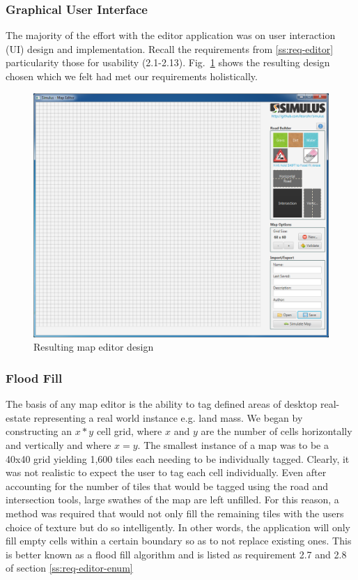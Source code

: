 \subsubsection{Graphical User Interface}
The majority of the effort with the editor application was on user interaction (UI) design and implementation. Recall the requirements from \ref{ss:req-editor} particularity those for usability (2.1-2.13). Fig.~\ref{fig:finalMapEditor} shows the resulting design chosen which we felt had met our requirements holistically.


\begin{figure}[h]
	\begin{center}
			\includegraphics[scale=0.45]{img/mapEditorFinal.png}
		\caption{Resulting map editor design}
		\label{fig:finalMapEditor}
	\end{center}
\end{figure}

\subsubsection{Flood Fill}
The basis of any map editor is the ability to tag defined areas of desktop real-estate representing a real world instance e.g. land mass. We began by constructing an $x*y$ cell grid, where $x$ and $y$ are the number of cells horizontally and vertically and where $x=y$. The smallest instance of a map was to be a 40x40 grid yielding 1,600 tiles each needing to be individually tagged. Clearly, it was not realistic to expect the user to tag each cell individually. Even after accounting for the number of tiles that would be tagged using the road and intersection tools, large swathes of the map are left unfilled.  
For this reason, a method was required that would not only fill the remaining tiles with the users choice of texture but do so intelligently. In other words, the application will only fill empty cells within a certain boundary so as to not replace existing ones. This is better known as a flood fill algorithm and is listed as requirement 2.7 and 2.8 of section \ref{ss:req-editor-enum}

